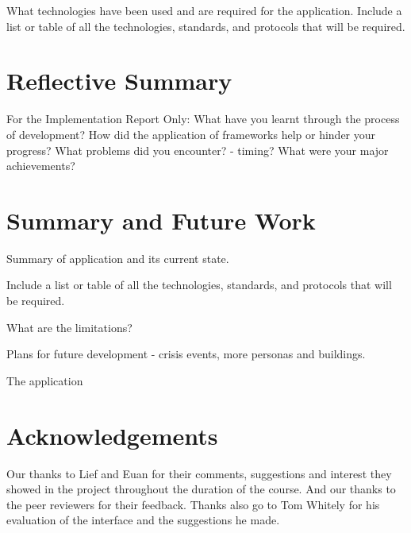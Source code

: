 \documentclass{sig-alt-release2}
\begin{document}
What technologies have been used and are required for the application. Include a list or table of all the technologies, standards, and protocols that will be required.

\section{Reflective Summary}

For the Implementation Report Only:
What have you learnt through the process of development? 
How did the application of frameworks help or hinder your progress?
What problems did you encounter? - timing?
What were your major achievements?


\section{Summary and Future Work}

Summary of application and its current state.

Include a list or table of all the technologies, standards, and protocols that will be required.

What are the limitations?

Plans for future development - crisis events, more personas and buildings.

The application 

\section{Acknowledgements}
Our thanks to Lief and Euan for their comments, suggestions and interest they showed in the project throughout the duration of the course. And our thanks to the peer reviewers for their feedback.
Thanks also go to Tom Whitely for his evaluation of the interface and the suggestions he made.



\end{document}
